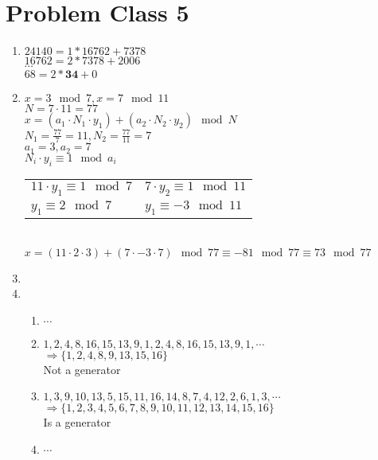 \section{Problem Class 5}
	\begin{enumerate}
		\item
		$24140 = 1 * 16762 + 7378 $\\
		$16762 = 2 * 7378 + 2006 $\\
		$\cdots $\\
		$68 = 2 * \mathbf{34} + 0 $\\
		\item
		$x=3\mod 7, x=7\mod 11$\\
		$N=7\cdot 11=77$\\
		$x=(a_1\cdot N_1\cdot y_1)+(a_2\cdot N_2\cdot y_2) \mod N$\\
		$N_1=\frac{77}{7}=11, N_2=\frac{77}{11}=7$\\
		$a_1=3, a_2=7$\\
		$N_i\cdot y_i \equiv 1 \mod a_i$\\
		\begin{tabular}{ll}
			$11 \cdot y_1 \equiv 1 \mod 7$ & $7 \cdot y_2 \equiv 1 \mod 11$\\
			$y_1\equiv 2 \mod 7$ & $y_1 \equiv -3 \mod 11$
		\end{tabular}\\
		$x=(11\cdot 2 \cdot 3)+(7\cdot -3 \cdot 7) \mod 77 \equiv -81 \mod 77 \equiv 73 \mod 77$
		\item
		\item
		\begin{enumerate}
			\item $\cdots$
			\item $1,2,4,8,16,15,13,9,1,2,4,8,16,15,13,9,1,\cdots$\\
				$\Rightarrow \{1,2,4,8,9,13,15,16\}$\\
				Not a generator
			\item $1,3,9,10,13,5,15,11,16,14,8,7,4,12,2,6,1,3,\cdots$\\
				$\Rightarrow \{1,2,3,4,5,6,7,8,9,10,11,12,13,14,15,16\}$\\
				Is a generator
			\item $\cdots$
		\end{enumerate}
		

	\end{enumerate}

